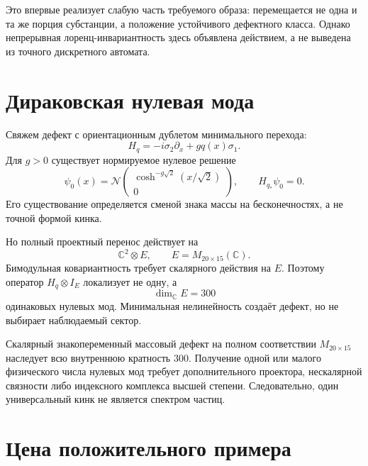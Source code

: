 Это впервые реализует слабую часть требуемого образа: перемещается не
одна и та же порция субстанции, а положение устойчивого дефектного класса.
Однако непрерывная лоренц-инвариантность здесь объявлена действием, а не
выведена из точного дискретного автомата.

\section{Дираковская нулевая мода}

Свяжем дефект с ориентационным дублетом минимального перехода:
\begin{equation}
 H_q=-i\sigma_2\partial_x+gq(x)\sigma_1.
 \label{eq:v5-self-defect-dirac}
\end{equation}
Для $g>0$ существует нормируемое нулевое решение
\begin{equation}
 \psi_0(x)=\mathcal N
 \begin{pmatrix}
 \cosh^{-g\sqrt2}(x/\sqrt2)\\0
 \end{pmatrix},
 \qquad H_{q_*}\psi_0=0.
 \label{eq:v5-self-defect-zero-mode}
\end{equation}
Его существование определяется сменой знака массы на бесконечностях, а не
точной формой кинка.

Но полный проектный перенос действует на
\begin{equation}
 \mathbb C^2\otimes E,
 \qquad E=M_{20\times15}(\mathbb C).
\end{equation}
Бимодульная ковариантность требует скалярного действия на $E$. Поэтому
оператор $H_q\otimes I_E$ локализует не одну, а
\begin{equation}
 \dim_{\mathbb C}E=300
 \end{equation}
одинаковых нулевых мод. Минимальная нелинейность создаёт дефект, но не
выбирает наблюдаемый сектор.

\begin{nogocriterion}
Скалярный знакопеременный массовый дефект на полном соответствии
$M_{20\times15}$ наследует всю внутреннюю кратность $300$. Получение одной
или малого физического числа нулевых мод требует дополнительного
проектора, нескалярной связности либо индексного комплекса высшей степени.
Следовательно, один универсальный кинк не является спектром частиц.
\end{nogocriterion}

\section{Цена положительного примера}

